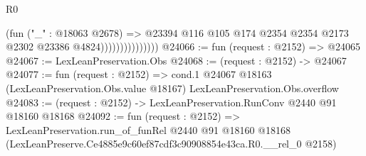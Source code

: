 \begin{lexlean}{R0}
\begin{coremodule}
                                (fun ("_" : @18063 @2678) =>
                                @23394
                                  @116
                                  @105
                                  @174
                                  @2354
                                  @2354
                                  @2173
                                  @2302
                                  @23386
                                  @4824)))))))))))))))
@24066 := fun (request : @2152) => @24065
@24067 := LexLeanPreservation.Obs
@24068 := (request : @2152) -> @24067
@24077 := fun (request : @2152) =>
  cond.{1} @24067 @18163 (LexLeanPreservation.Obs.value @18167) LexLeanPreservation.Obs.overflow
@24083 := (request : @2152) -> LexLeanPreservation.RunConv @2440 @91 @18160 @18168
@24092 := fun (request : @2152) =>
  LexLeanPreservation.run_of_funRel
    @2440
    @91
    @18160
    @18168
    (LexLeanPreserve.Ce4885e9c60ef87cdf3c90908854e43ca.R0.__rel_0 @2158)
\end{coremodule}
\end{lexlean}

